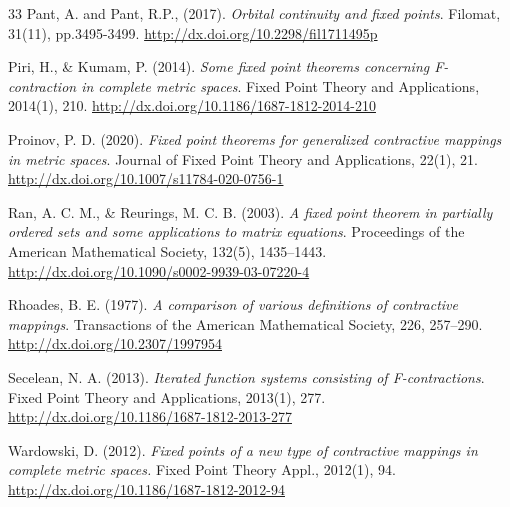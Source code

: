 \documentclass[11pt]{article}
\begin{document}
\begin{thebibliography}{33}
 Pant, A. and Pant, R.P., (2017). \emph{Orbital continuity and fixed points}. Filomat, 31(11), pp.3495-3499.
\url{http://dx.doi.org/10.2298/fil1711495p}

Piri, H., \& Kumam, P. (2014). \emph{Some fixed point theorems concerning 
F-contraction in complete metric spaces}. Fixed Point Theory and Applications, 2014(1), 210.
\url{http://dx.doi.org/10.1186/1687-1812-2014-210}


Proinov, P. D. (2020). \emph{Fixed point theorems for generalized contractive mappings in metric spaces}. Journal of Fixed Point Theory and Applications, 22(1), 21.
\url{http://dx.doi.org/10.1007/s11784-020-0756-1}


Ran, A. C. M., \& Reurings, M. C. B. (2003). \emph{A fixed point theorem in partially ordered sets and some applications to matrix equations}. Proceedings of the American Mathematical Society, 132(5), 1435–1443.
\url{http://dx.doi.org/10.1090/s0002-9939-03-07220-4}

Rhoades, B. E. (1977). \emph{A comparison of various definitions of contractive mappings}. Transactions of the American Mathematical Society, 226, 257–290.
\url{http://dx.doi.org/10.2307/1997954}

Secelean, N. A. (2013). \emph{Iterated function systems consisting of 
F-contractions}. Fixed Point Theory and Applications, 2013(1), 277.
\url{http://dx.doi.org/10.1186/1687-1812-2013-277}


 Wardowski, D. (2012). \emph{Fixed points of a new type of contractive mappings in complete metric spaces.} Fixed Point Theory Appl., 2012(1), 94.
\url{http://dx.doi.org/10.1186/1687-1812-2012-94}

\end{thebibliography}
\end{document}
